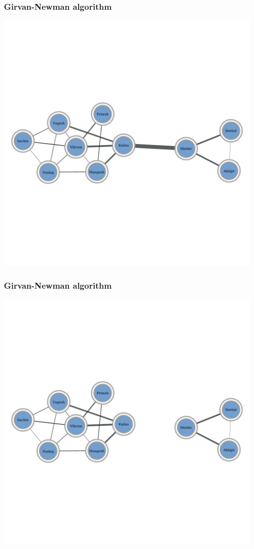 \documentclass{beamer}
\begin{document}
\begin{frame}
    \frametitle{Girvan-Newman algorithm}
    \centering
    \includegraphics[width=0.8\columnwidth]{gn0.pdf}
\end{frame}
\begin{frame}
    \frametitle{Girvan-Newman algorithm}
    \centering
    \includegraphics[width=0.8\columnwidth]{gn1.pdf}
\end{frame}
\end{document}
